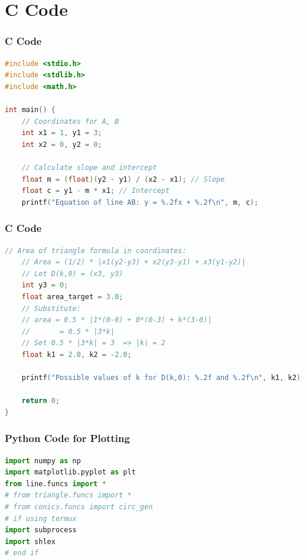 \documentclass{beamer}
\theoremstyle{remark}
\numberwithin{equation}{section}
\begin{document}
\section{ C Code}
\begin{frame}[fragile]
\frametitle{C Code }
\begin{lstlisting}[language=C]
#include <stdio.h>
#include <stdlib.h>
#include <math.h>

int main() {
    // Coordinates for A, B
    int x1 = 1, y1 = 3;
    int x2 = 0, y2 = 0;

    // Calculate slope and intercept
    float m = (float)(y2 - y1) / (x2 - x1); // Slope
    float c = y1 - m * x1; // Intercept
    printf("Equation of line AB: y = %.2fx + %.2f\n", m, c);
\end{lstlisting}
\end{frame}

\begin{frame}[fragile]
\frametitle{C Code }
\begin{lstlisting}[language=C]
        // Area of triangle formula in coordinates:
    // Area = (1/2) * |x1(y2-y3) + x2(y3-y1) + x3(y1-y2)|
    // Let D(k,0) = (x3, y3)
    int y3 = 0;
    float area_target = 3.0;
    // Substitute:
    // area = 0.5 * |1*(0-0) + 0*(0-3) + k*(3-0)|
    //       = 0.5 * |3*k|
    // Set 0.5 * |3*k| = 3  => |k| = 2
    float k1 = 2.0, k2 = -2.0;

    printf("Possible values of k for D(k,0): %.2f and %.2f\n", k1, k2);

    return 0;
}
\end{lstlisting}
\end{frame}
\begin{frame}[fragile]
\frametitle{Python Code for Plotting}
\begin{lstlisting}[language=Python]
import numpy as np
import matplotlib.pyplot as plt
from line.funcs import *
# from triangle.funcs import *
# from conics.funcs import circ_gen
# if using termux
import subprocess
import shlex
# end if

\end{lstlisting}

\end{frame}
\end{document}
